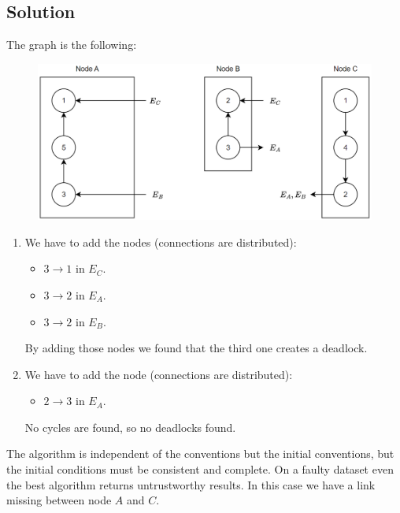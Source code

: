 \documentclass[12pt, a4paper]{report}
\newtheorem[style=M,bodystyle=\normalfont]{theorem}{Theorem}
\newtheorem[style=M,bodystyle=\normalfont]{corollary}{Corollary}
\newtheorem[style=M,bodystyle=\normalfont]{lemma}{Lemma}
\newtheorem[style=M,bodystyle=\normalfont]{definition}{Definition}
\begin{document}
    \subsection*{Solution}
        The graph is the following: 
        \begin{figure}[H]
            \centering
            \includegraphics[width=1\linewidth]{images/Ob4.png}
        \end{figure}
        \begin{enumerate}
            \item We have to add the nodes (connections are distributed): 
                \begin{itemize}
                    \item $3 \rightarrow 1$ in $E_C$. 
                    \item $3 \rightarrow 2$ in $E_A$. 
                    \item $3 \rightarrow 2$ in $E_B$. 
                \end{itemize}
                By adding those nodes we found that the third one creates a deadlock. 
            \item We have to add the node (connections are distributed): 
                \begin{itemize}
                    \item $2 \rightarrow 3$ in $E_A$. 
                \end{itemize}
                No cycles are found, so no deadlocks found. 
        \end{enumerate}
        The algorithm is independent of the conventions but the initial conventions, but the initial conditions must be consistent and complete. 
        On a faulty dataset even the best algorithm returns untrustworthy results. In this case we have a link missing between node $A$ and $C$.

    \newpage
\end{document}
